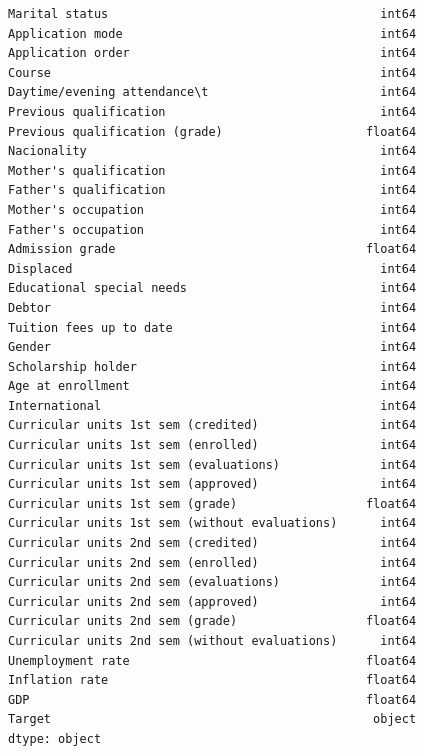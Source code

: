 \documentclass[
  letterpaper,
  DIV=11,
  numbers=noendperiod]{scrartcl}
\begin{document}
\begin{verbatim}
Marital status                                      int64
Application mode                                    int64
Application order                                   int64
Course                                              int64
Daytime/evening attendance\t                        int64
Previous qualification                              int64
Previous qualification (grade)                    float64
Nacionality                                         int64
Mother's qualification                              int64
Father's qualification                              int64
Mother's occupation                                 int64
Father's occupation                                 int64
Admission grade                                   float64
Displaced                                           int64
Educational special needs                           int64
Debtor                                              int64
Tuition fees up to date                             int64
Gender                                              int64
Scholarship holder                                  int64
Age at enrollment                                   int64
International                                       int64
Curricular units 1st sem (credited)                 int64
Curricular units 1st sem (enrolled)                 int64
Curricular units 1st sem (evaluations)              int64
Curricular units 1st sem (approved)                 int64
Curricular units 1st sem (grade)                  float64
Curricular units 1st sem (without evaluations)      int64
Curricular units 2nd sem (credited)                 int64
Curricular units 2nd sem (enrolled)                 int64
Curricular units 2nd sem (evaluations)              int64
Curricular units 2nd sem (approved)                 int64
Curricular units 2nd sem (grade)                  float64
Curricular units 2nd sem (without evaluations)      int64
Unemployment rate                                 float64
Inflation rate                                    float64
GDP                                               float64
Target                                             object
dtype: object
\end{verbatim}
\end{document}
